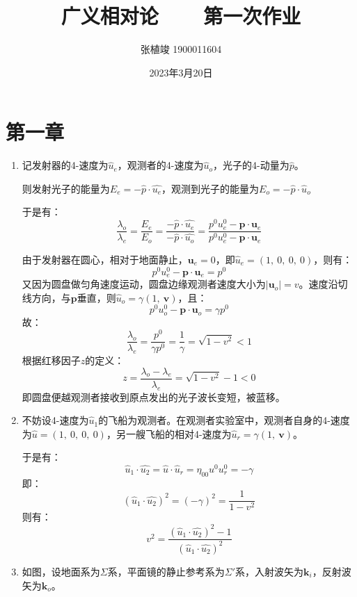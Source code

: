 \documentclass[a4paper]{article}
\title{\textbf{广义相对论\ \ \ \ 第一次作业}}
\author{张植竣 1900011604}
\date{2023年3月20日}
\begin{document}
\maketitle

\section*{第一章}

\begin{enumerate}
    \item[9.]
    记发射器的4-速度为$\hat{u}_e$，观测者的4-速度为$\hat{u}_o$，光子的4-动量为$\hat{p}$。

    则发射光子的能量为$E_e = -\hat{p} \cdot \hat{u_e}$，观测到光子的能量为$E_o = -\hat{p} \cdot \hat{u}_o$

    于是有：
    \[
        \frac{\lambda_o}{\lambda_e} = \frac{E_e}{E_o} = \frac{-\hat{p} \cdot \hat{u_e}}{-\hat{p} \cdot \hat{u_o}} = \frac{p^0 u_e^0 - \mathbf{p} \cdot \mathbf{u}_e}{p^0 u_e^0 - \mathbf{p} \cdot \mathbf{u}_e}
    \]

    由于发射器在圆心，相对于地面静止，$\mathbf{u}_e = 0$，即$\hat{u}_e = (1,\ 0,\ 0,\ 0)$，则有：
    \[
        p^0 u_e^0 - \mathbf{p} \cdot \mathbf{u}_e = p^0
    \]
    又因为圆盘做匀角速度运动，圆盘边缘观测者速度大小为$|\mathbf{u}_o| = v$。速度沿切线方向，与$\mathbf{p}$垂直，则$\hat{u}_o = \gamma(1,\ \mathbf{v})$，且：
    \[
        p^0 u_o^0 - \mathbf{p} \cdot \mathbf{u}_o = \gamma p^0
    \]
    故：
    \[
        \frac{\lambda_o}{\lambda_e} = \frac{p^0}{\gamma p^0} = \frac{1}{\gamma} = \sqrt{1 - v^2} < 1
    \]
    根据红移因子$z$的定义：
    \[
        z = \frac{\lambda_o - \lambda_e}{\lambda_e} = \sqrt{1 - v^2} - 1 < 0
    \]
    即圆盘便越观测者接收到原点发出的光子波长变短，被蓝移。

    \bigskip
    \item[10.]
    不妨设4-速度为$\hat{u}_1$的飞船为观测者。在观测者实验室中，观测者自身的4-速度为$\hat{u} = (1,\ 0,\ 0,\ 0)$，另一艘飞船的相对4-速度为$\hat{u}_r = \gamma(1,\ \mathbf{v})$。

    于是有：
    \[
        \hat{u}_1 \cdot \hat{u_2} = \hat{u} \cdot \hat{u}_r = \eta_{00} u^0 u_r^0 = -\gamma
    \]
    即：
    \[
        (\hat{u}_1 \cdot \hat{u_2})^2 = (-\gamma)^2 = \frac{1}{1 - v^2}
    \]
    则有：
    \[
        v^2 = \frac{(\hat{u}_1 \cdot \hat{u_2})^2 - 1}{(\hat{u}_1 \cdot \hat{u_2})^2}
    \]

    \bigskip
    \item[15.]
    如图，设地面系为$\varSigma$系，平面镜的静止参考系为$\varSigma'$系，入射波矢为$\mathbf{k}_i$，反射波矢为$\mathbf{k}_o$。


\end{enumerate}
\end{document}
